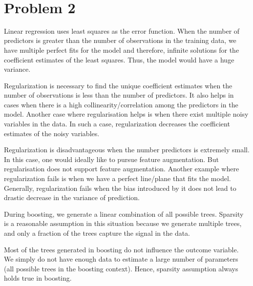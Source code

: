 \documentclass[11pt]{article}
\begin{document}
\begin{center}

\ \\
\end{center}

\section*{Problem 2}

\vspace{5 mm}
\noindent
Linear regression uses least squares as the error function. When the number of predictors is
greater than the number of observations in the training data, we have multiple perfect fits for the
model and therefore, infinite solutions for the coefficient estimates of the least squares. Thus, the model
would have a huge variance.

Regularization is necessary to find the unique coefficient estimates when the number of observations
is less than the number of predictors. It also helps in cases when there is a high collinearity/correlation 
among the predictors in the model. Another case where regularisation helps is when there exist multiple 
noisy variables in the data. In such a case, regularization decreases the coefficient estimates of the noisy 
variables. 

Regularization is disadvantageous when the number predictors is extremely small. In this case, one would 
ideally like to pursue feature augmentation. But regularisation does not support feature augmentation. 
Another example where regularization fails is when we have a perfect line/plane that fits the model. 
Generally, regularization fails when the bias introduced by it does not lead to drastic decrease in the 
variance of prediction. 

During boosting, we generate a linear combination of all possible trees. Sparsity is a reasonable assumption 
in this situation because we generate multiple trees, and only a fraction of the trees capture the signal in the data. 

Most of the trees generated in boosting do not influence the outcome variable. We simply do not have 
enough data to estimate a large number of parameters (all possible trees in the boosting context). Hence, 
sparsity assumption always holds true in boosting.


\vspace{5 mm}
\noindent
\end{document}
